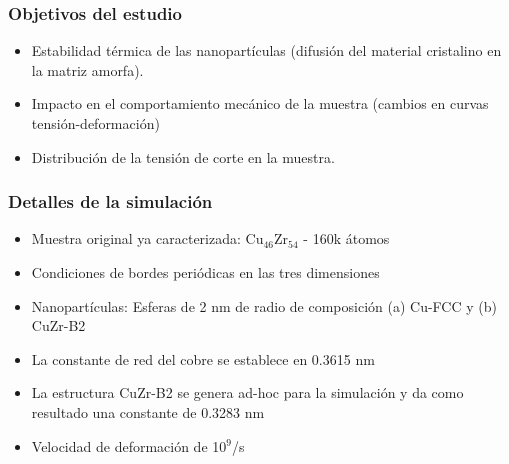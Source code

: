 \begin{frame}
\frametitle{Objetivos del estudio}
\vspace{0.5cm}
 \begin{itemize}
  \item Estabilidad térmica de las nanopartículas (difusión del material cristalino en la matriz amorfa).
  \item Impacto en el comportamiento mecánico de la muestra (cambios en curvas tensión-deformación)
  \item Distribución de la tensión de corte en la muestra.
 \end{itemize}
\end{frame}

\begin{frame}
 \frametitle{Detalles de la simulación}
 \vspace{0.5cm}
 \begin{itemize}
  \item Muestra original ya caracterizada: Cu$_{46}$Zr$_{54}$ - 160k átomos
  \item Condiciones de bordes periódicas en las tres dimensiones
  \item Nanopartículas: Esferas de 2 nm de radio de composición (a) Cu-FCC y (b) CuZr-B2
  \item La constante de red del cobre se establece en 0.3615 nm
  \item La estructura CuZr-B2 se genera ad-hoc para la simulación y da como resultado una constante de 0.3283 nm
  \item Velocidad de deformación de 10$^{9}$/s
 \end{itemize}
\end{frame}


